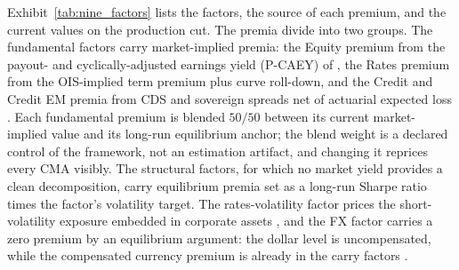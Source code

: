 \documentclass[pdftex,12pt,a4paper]{article}
\begin{document}
Exhibit~\ref{tab:nine_factors} lists the factors, the source of each premium, and the current values on the production cut. The premia divide into two groups. The fundamental factors carry market-implied premia: the Equity premium from the payout- and cyclically-adjusted earnings yield (P-CAEY) of \citet{HaghaniWhite2024}, the Rates premium from the OIS-implied term premium plus curve roll-down, and the Credit and Credit EM premia from CDS and sovereign spreads net of actuarial expected loss \citep{Ilmanen2011}. Each fundamental premium is blended $50/50$ between its current market-implied value and its long-run equilibrium anchor; the blend weight is a declared control of the framework, not an estimation artifact, and changing it reprices every CMA visibly. The structural factors, for which no market yield provides a clean decomposition, carry equilibrium premia set as a long-run Sharpe ratio times the factor's volatility target. The rates-volatility factor prices the short-volatility exposure embedded in corporate assets \citep{Morris2026}, and the FX factor carries a zero premium by an equilibrium argument: the dollar level is uncompensated, while the compensated currency premium is already in the carry factors \citep{LustigRV2011}.
\end{document}

